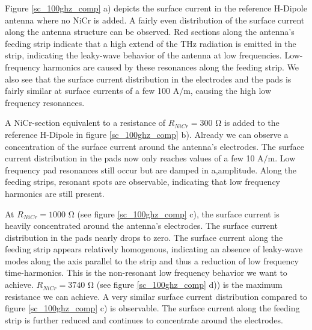 Figure \ref{sc_100ghz_comp} a) depicts the surface current in the reference H-Dipole antenna where no NiCr is added. A fairly even distribution of the surface current along the antenna structure can be observed. Red sections along the antenna's feeding strip indicate that a high extend of the THz radiation is emitted in the strip, indicating the leaky-wave behavior of the antenna at low frequencies. Low-frequency harmonics are caused by these resonances along the feeding strip. We also see that the surface current distribution in the electrodes and the pads is fairly similar at surface currents of a few 100 A$/$m, causing the high low frequency resonances. 

A NiCr-section equivalent to a resistance of $R_{NiCr} = 300$ \si{\ohm} is added to the reference H-Dipole in figure \ref{sc_100ghz_comp} b). Already we can observe a concentration of the surface current around the antenna's electrodes. The surface current distribution in the pads now only reaches values of a few 10 A$/$m. Low frequency pad resonances still occur but are damped in a,amplitude. Along the feeding strips, resonant spots are observable, indicating that low frequency harmonics are still present. 


At $R_{NiCr} = 1000$ \si{\ohm} (see figure \ref{sc_100ghz_comp} c), the surface current is heavily concentrated around the antenna's electrodes. The surface current distribution in the pads nearly drops to zero. The surface current along the feeding strip appears relatively homogenous, indicating an absence of leaky-wave modes along the axis parallel to the strip and thus a reduction of low frequency time-harmonics. This is the non-resonant low frequency behavior we want to achieve. $R_{NiCr} = 3740$ \si{\ohm} (see figure \ref{sc_100ghz_comp} d)) is the maximum resistance we can achieve. A very similar surface current distribution compared to figure \ref{sc_100ghz_comp} c) is observable. The surface current along the feeding strip is further reduced and continues to concentrate around the electrodes. 

